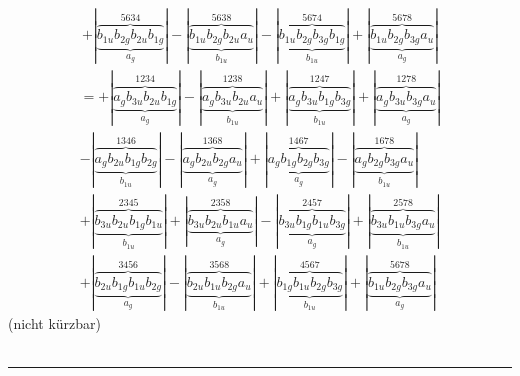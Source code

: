 \documentclass{article}
\begin{document}
\begin{multline*}
+\left|\underbrace{\overbrace{b_{1u} b_{2g} b_{2u} b_{1g}}^{5 6 3 4}}_{a_{g}}\right|-\left|\underbrace{\overbrace{b_{1u} b_{2g} b_{2u} a_{u}}^{5 6 3 8}}_{b_{1u}}\right|-\left|\underbrace{\overbrace{b_{1u} b_{2g} b_{3g} b_{1g}}^{5 6 7 4}}_{b_{1u}}\right|+\left|\underbrace{\overbrace{b_{1u} b_{2g} b_{3g} a_{u}}^{5 6 7 8}}_{a_{g}}\right|
\end{multline*}\begin{multline*}
=+\left|\underbrace{\overbrace{a_{g} b_{3u} b_{2u} b_{1g}}^{1 2 3 4}}_{a_{g}}\right|-\left|\underbrace{\overbrace{a_{g} b_{3u} b_{2u} a_{u}}^{1 2 3 8}}_{b_{1u}}\right|+\left|\underbrace{\overbrace{a_{g} b_{3u} b_{1g} b_{3g}}^{1 2 4 7}}_{b_{1u}}\right|+\left|\underbrace{\overbrace{a_{g} b_{3u} b_{3g} a_{u}}^{1 2 7 8}}_{a_{g}}\right|\\
-\left|\underbrace{\overbrace{a_{g} b_{2u} b_{1g} b_{2g}}^{1 3 4 6}}_{b_{1u}}\right|-\left|\underbrace{\overbrace{a_{g} b_{2u} b_{2g} a_{u}}^{1 3 6 8}}_{a_{g}}\right|+\left|\underbrace{\overbrace{a_{g} b_{1g} b_{2g} b_{3g}}^{1 4 6 7}}_{a_{g}}\right|-\left|\underbrace{\overbrace{a_{g} b_{2g} b_{3g} a_{u}}^{1 6 7 8}}_{b_{1u}}\right|\\
+\left|\underbrace{\overbrace{b_{3u} b_{2u} b_{1g} b_{1u}}^{2 3 4 5}}_{b_{1u}}\right|+\left|\underbrace{\overbrace{b_{3u} b_{2u} b_{1u} a_{u}}^{2 3 5 8}}_{a_{g}}\right|-\left|\underbrace{\overbrace{b_{3u} b_{1g} b_{1u} b_{3g}}^{2 4 5 7}}_{a_{g}}\right|+\left|\underbrace{\overbrace{b_{3u} b_{1u} b_{3g} a_{u}}^{2 5 7 8}}_{b_{1u}}\right|\\
+\left|\underbrace{\overbrace{b_{2u} b_{1g} b_{1u} b_{2g}}^{3 4 5 6}}_{a_{g}}\right|-\left|\underbrace{\overbrace{b_{2u} b_{1u} b_{2g} a_{u}}^{3 5 6 8}}_{b_{1u}}\right|+\left|\underbrace{\overbrace{b_{1g} b_{1u} b_{2g} b_{3g}}^{4 5 6 7}}_{b_{1u}}\right|+\left|\underbrace{\overbrace{b_{1u} b_{2g} b_{3g} a_{u}}^{5 6 7 8}}_{a_{g}}\right|
\end{multline*}(nicht kürzbar)\\ \\
\hrule\newpage 
\end{document}
